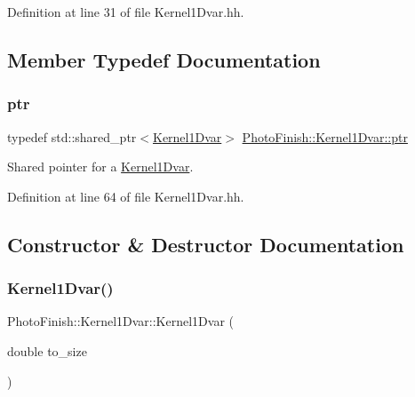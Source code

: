 Definition at line 31 of file Kernel1\+Dvar.\+hh.



\subsection{Member Typedef Documentation}
\mbox{\label{class_photo_finish_1_1_kernel1_dvar_a5e4ab77c4e5998cfb7341514a4f8fea8}} 
\subsubsection{\texorpdfstring{ptr}{ptr}}
{\footnotesize\ttfamily typedef std\+::shared\+\_\+ptr$<$\hyperlink{class_photo_finish_1_1_kernel1_dvar}{Kernel1\+Dvar}$>$ \hyperlink{class_photo_finish_1_1_kernel1_dvar_a5e4ab77c4e5998cfb7341514a4f8fea8}{Photo\+Finish\+::\+Kernel1\+Dvar\+::ptr}}



Shared pointer for a \hyperlink{class_photo_finish_1_1_kernel1_dvar}{Kernel1\+Dvar}. 



Definition at line 64 of file Kernel1\+Dvar.\+hh.



\subsection{Constructor \& Destructor Documentation}
\mbox{\label{class_photo_finish_1_1_kernel1_dvar_ae931da40a0626469cac882022b7c54da}} 
\subsubsection{\texorpdfstring{Kernel1\+Dvar()}{Kernel1Dvar()}\hspace{0.1cm}{\footnotesize\ttfamily [1/2]}}
{\footnotesize\ttfamily Photo\+Finish\+::\+Kernel1\+Dvar\+::\+Kernel1\+Dvar (\begin{DoxyParamCaption}\item[{double}]{to\+\_\+size }\end{DoxyParamCaption})\hspace{0.3cm}{\ttfamily [protected]}}



